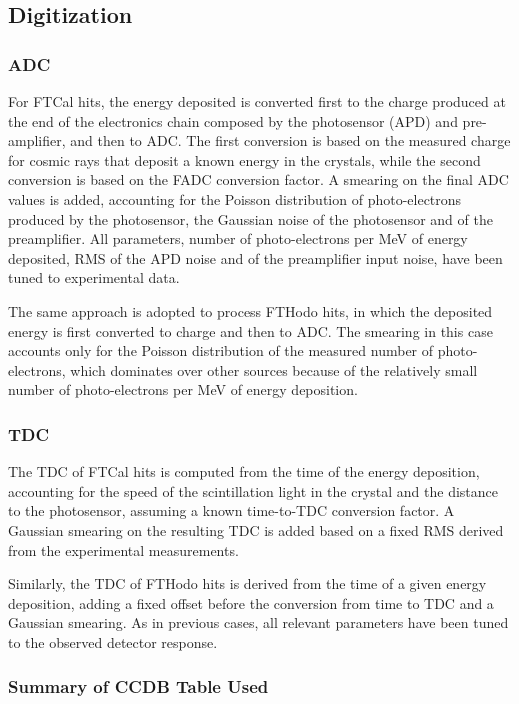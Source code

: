 \subsection{Digitization}

\subsubsection{ADC}
For FTCal hits, the energy deposited is converted first to the charge produced at the end of the electronics chain composed
by the photosensor (APD) and pre-amplifier, and then to ADC.
The first conversion is based on the measured charge for cosmic rays that deposit a known energy in the crystals,
while the second conversion is based on the FADC conversion factor. A smearing on the final ADC values is added,
accounting for the Poisson distribution of photo-electrons produced by the photosensor, the Gaussian noise of the
photosensor and of the preamplifier. All parameters, number of photo-electrons per MeV of energy deposited, RMS of the
APD noise and of the preamplifier input noise, have been tuned to experimental data.

The same approach is adopted to process FTHodo hits, in which the deposited energy is first converted to charge and then to ADC.
The smearing in this case accounts only for the Poisson distribution of the measured number of photo-electrons,
which dominates over other sources because of the relatively small number of photo-electrons per MeV of energy deposition.

\subsubsection{TDC}
The TDC of FTCal hits is computed from the time of the energy deposition, accounting for the speed of the scintillation light in
the crystal and the distance to the photosensor, assuming a known time-to-TDC conversion factor. A Gaussian smearing on the
resulting TDC is added based on a fixed RMS derived from the experimental measurements.

Similarly, the TDC of FTHodo hits is derived from the time of a given energy deposition, adding a fixed offset before the
conversion from time to TDC and a Gaussian smearing. As in previous cases, all relevant parameters have been tuned to the
observed detector response.

\subsubsection{Summary of CCDB Table Used}
